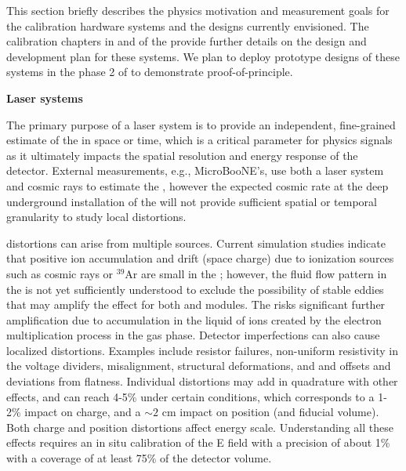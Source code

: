 This section briefly describes the physics motivation and measurement goals for the calibration hardware systems and the designs currently envisioned. The calibration chapters in \voltitlesp{} and \voltitledp{} of the  provide further details on the design and development plan for these systems. We plan to deploy prototype designs of these systems in 
the phase 2 of  to demonstrate proof-of-principle.

\textbf{Laser systems} 

The primary purpose of a laser system is to provide an independent, fine-grained estimate of the \efield in space or time, which is a critical parameter for physics signals as it ultimately impacts the spatial resolution and energy response of the detector. External measurements, e.g.,  MicroBooNE's, use both a laser system and cosmic rays to estimate the \efield, however the expected cosmic rate at the deep underground installation of the  will not provide sufficient spatial or temporal granularity to study local distortions.

\efield distortions can arise from multiple sources. Current simulation studies indicate that positive ion accumulation and drift (space charge) due to ionization sources such as cosmic rays or ${}^{39}$Ar are small in the ; however, the fluid flow pattern in the  is not yet sufficiently understood to exclude the possibility of stable eddies that may amplify the effect for both \single and \dual modules. The  risks significant further amplification due to  accumulation in the liquid of ions created by the electron multiplication process in the gas phase.
Detector imperfections can also cause localized \efield distortions. Examples include  resistor failures, non-uniform resistivity in the voltage dividers,  misalignment,  structural deformations, and  and  offsets and  deviations from flatness. Individual \efield distortions may add in quadrature with other effects, and can reach 4-5\% under certain conditions, which corresponds to a 1-2\% impact on charge, 
and a $\sim 2$ cm impact on position (and fiducial volume). Both charge and position distortions affect energy scale. Understanding all these effects requires an in situ calibration of the E field with a precision of about 1\% with a coverage of at least 75\% of the detector volume.

